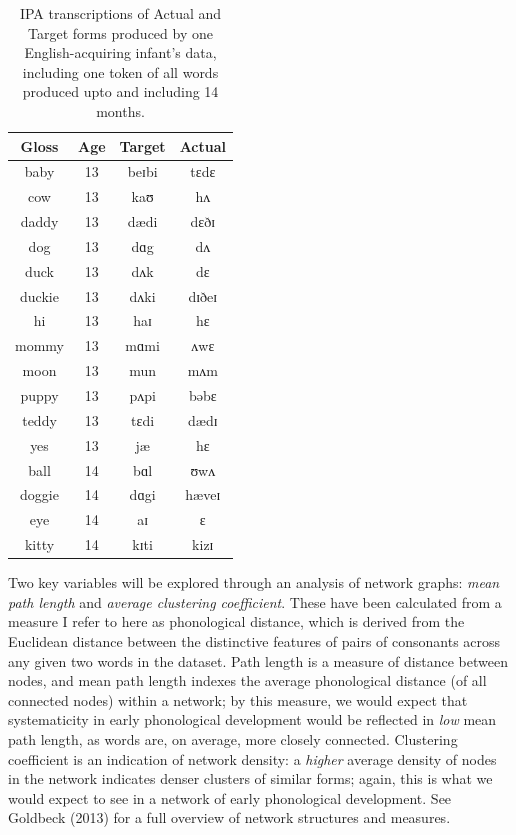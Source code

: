 \documentclass[
  man]{apa6}
\begin{document}
\begin{longtable}[t]{cccc}
\caption{\label{tab:Table-IPA-egs}IPA transcriptions of Actual and Target forms produced by one English-acquiring infant's data, including one token of all words produced upto and including 14 months.}\\
\toprule
Gloss & Age & Target & Actual\\
\midrule
baby & 13 & beɪbi & tɛdɛ\\
cow & 13 & kaʊ & hʌ\\
daddy & 13 & dædi & dɛðɪ\\
dog & 13 & dɑg & dʌ\\
duck & 13 & dʌk & dɛ\\
\addlinespace
duckie & 13 & dʌki & dɪðeɪ\\
hi & 13 & haɪ & hɛ\\
mommy & 13 & mɑmi & ʌwɛ\\
moon & 13 & mun & mʌm\\
puppy & 13 & pʌpi & bəbɛ\\
\addlinespace
teddy & 13 & tɛdi & dædɪ\\
yes & 13 & jæ & hɛ\\
ball & 14 & bɑl & ʊwʌ\\
doggie & 14 & dɑgi & hæveɪ\\
eye & 14 & aɪ & ɛ\\
\addlinespace
kitty & 14 & kɪti & kizɪ\\
\bottomrule
\end{longtable}

Two key variables will be explored through an analysis of network graphs: \emph{mean path length} and \emph{average clustering coefficient}. These have been calculated from a measure I refer to here as phonological distance, which is derived from the Euclidean distance between the distinctive features of pairs of consonants across any given two words in the dataset. Path length is a measure of distance between nodes, and mean path length indexes the average phonological distance (of all connected nodes) within a network; by this measure, we would expect that systematicity in early phonological development would be reflected in \emph{low} mean path length, as words are, on average, more closely connected. Clustering coefficient is an indication of network density: a \emph{higher} average density of nodes in the network indicates denser clusters of similar forms; again, this is what we would expect to see in a network of early phonological development. See Goldbeck (2013) for a full overview of network structures and measures.
\end{document}
